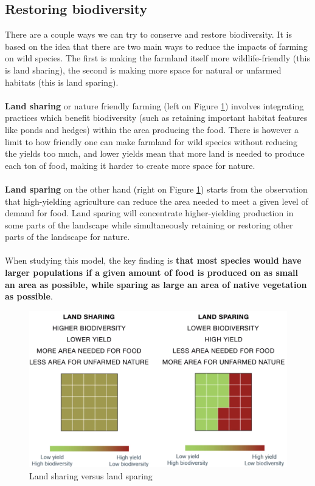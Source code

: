 \documentclass[../summary.tex]{subfiles}
\begin{document}
	\subsection{Restoring biodiversity}
	There are a couple ways we can try to conserve and restore biodiversity. It is based on the idea that there are two main ways to reduce the impacts of farming on wild species. The first is making the farmland itself more wildlife-friendly (this is land sharing), the second is making more space for natural or unfarmed habitats (this is land sparing).
	\\
	\\
	\textbf{Land sharing} or nature friendly farming (left on Figure \ref{fig:land-sharing-sparing}) involves integrating practices which benefit biodiversity (such as retaining important habitat features like ponds and hedges) within the area producing the food. There is however a limit to how friendly one can make farmland for wild species without reducing the yields too much, and lower yields mean that more land is needed to produce each ton of food, making it harder to create more space for nature.
	\\
	\\
	\textbf{Land sparing} on the other hand (right on Figure \ref{fig:land-sharing-sparing}) starts from the observation that high-yielding agriculture can reduce the area needed to meet a given level of demand for food. Land sparing will concentrate higher-yielding production in some parts of the landscape while simultaneously retaining or restoring other parts of the landscape for nature.
	\\
	\\
	When studying this model, the key finding is \textbf{that most species would have larger populations if a given amount of food is produced on as small an area as possible, while sparing as large an area of native vegetation as possible}. 
	\\
	\begin{figure}[htbp]
		\centering
		\includegraphics[width=0.8\linewidth]{images/2-land-sharing-sparing.png}
		\caption{Land sharing versus land sparing}
		\label{fig:land-sharing-sparing}
	\end{figure}
\end{document}
